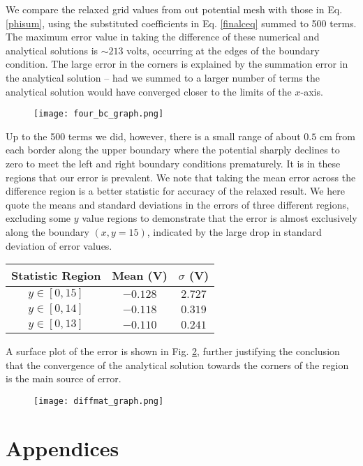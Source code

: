 \documentclass[reprint, amsmath, amssymb, aps, floatfix]{revtex4-1}
\begin{document}
We compare the relaxed grid values from out potential mesh with those in Eq. \eqref{phisum}, using the substituted coefficients in Eq. \eqref{finalceq} summed to 500 terms. The maximum error value in taking the difference of these numerical and analytical solutions is $\sim 213$ volts, occurring at the edges of the boundary condition. The large error in the corners is explained by the summation error in the analytical solution -- had we summed to a larger number of terms the analytical solution would have converged closer to the limits of the $x$-axis. 
\begin{figure}[H]
	\texttt{[image: four\_bc\_graph.png]}
	\label{graphnosource}
\end{figure}
Up to the 500 terms we did, however, there is a small range of about $0.5$ cm from each border along the upper boundary where the potential sharply declines to zero to meet the left and right boundary conditions prematurely. It is in these regions that our error is prevalent. We note that taking the mean error across the difference region is a better statistic for accuracy of the relaxed result. We here quote the means and standard deviations in the errors of three different regions, excluding some $y$ value regions to demonstrate that the error is almost exclusively along the boundary $(x, y=15)$, indicated by the large drop in standard deviation of error values.
\begin{table}
	\centering
\begin{tabular}{|c|c|c|}
	\hline
	Statistic Region & Mean (V) & $\sigma$ (V)  \\ \hline
	$y\in[0,15]$ & $-0.128$ & $2.727$ \\ \hline
	$y\in[0, 14]$ & $-0.118$ & $0.319$ \\ \hline
	$y\in[0, 13]$ & $-0.110$ & $0.241$  \\ \hline
\end{tabular}
\end{table}

A surface plot of the error is shown in Fig. \ref{diffmat}, further justifying the conclusion that the convergence of the analytical solution towards the corners of the region is the main source of error.

\begin{figure}[H]
	\texttt{[image: diffmat\_graph.png]}
	\label{diffmat}
\end{figure}


\section{Appendices}






\end{document}
